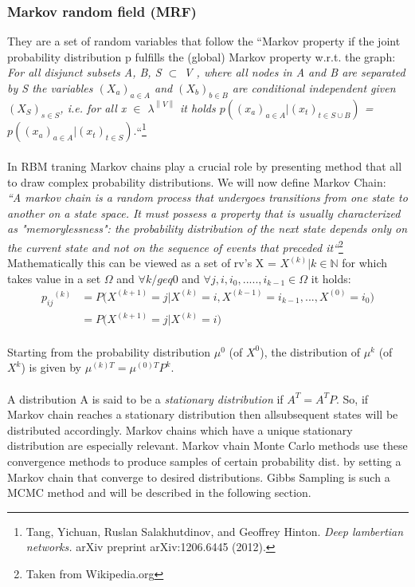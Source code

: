 \documentclass{article}
\newcommand{\norm}[1]{\left\lVert#1\right\rVert}
\begin{document}
\subsubsection{Markov random field (MRF)}
They are a set of random variables that follow the ``Markov property if the joint probability distribution p fulfills the (global) Markov property w.r.t. the graph: 
\\\textit{For all disjunct subsets A, B, S $\subset$ V , where all nodes in A and B are separated by S the variables $(X_a)_{a\in A}$ and $(X_b)_{b\in B}$ are conditional independent given $(X_S)_{s\in S}$, i.e. for all x $\in$ $\lambda^{\norm{V}}$ it holds $p ((x_a)_{a \in A}|(x_t)_{t \in S \cup B})$ = $ p ((x_a)_{a \in A} | (x_t)_{t \in S} ).$}``\footnote{Tang, Yichuan, Ruslan Salakhutdinov, and Geoffrey Hinton. \textit{Deep lambertian networks.} arXiv preprint arXiv:1206.6445 (2012).}
\\\\In RBM traning Markov chains play a crucial role by presenting method that all to draw complex probability distributions.
We will now define Markov Chain:
\\\textit{``A markov chain is a random process that undergoes transitions from one state to another on a state space. It must possess a property that is usually characterized as "memorylessness": the probability distribution of the next state depends only on the current state and not on the sequence of events that preceded it``}\footnote{Taken from Wikipedia.org}
\\Mathematically this can be viewed as a set of rv's X = { $X^(k)| k \in \mathbb{N}$} for which takes value in a set $\Omega$ and $\forall k /geq 0 $ and $\forall j,i,i_{0},....., i_{k-1} \in \Omega$ it holds:
\begin{equation}
\begin{split}
{p_{ij}}^{(k)} & = P \Big( X^{(k+1)} = j | X^{(k)} = i, X^{(k-1)} = i_{k-1},...,X^{(0)} = i_0 \Big) \\
& = P \Big( X^{(k+1)} = j | X^{(k)} = i \Big)
\end{split}
\end{equation}
\\Starting from the probability distribution $\mu^0$ (of $X^0$), the distribution of $\mu^k$ (of $X^k$) is given by $\mu^{(k) T} = \mu^{(0) T} P^k$.
\\\\A distribution A is said to be a \textit{stationary distribution} if $A^{T} = A^T P$. So, if Markov chain reaches a stationary distribution then allsubsequent states will be distributed accordingly. Markov chains which have a unique stationary distribution are especially relevant. Markov vhain Monte Carlo methods use these convergence methods to produce samples of certain probability dist. by setting a Markov chain that converge to desired distributions. Gibbs Sampling is such a MCMC method and will be described in the following section.
\end{document}
